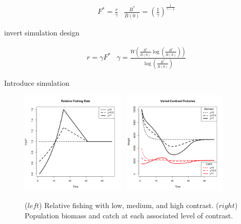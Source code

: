 \documentclass[ xcolor = pdftex, dvipsnames, table ]{beamer}
\begin{document}
%
\begin{frame}
%
\begin{align}\label{ptRP}
&F^* = \frac{r}{\gamma}
&\frac{B^*}{\bar B(0)} = \left(\frac{1}{\gamma}\right)^{\frac{1}{\gamma-1}}
\end{align}

\color{red} invert simulation design

%
\begin{align}
&r = \gamma F^*
&\gamma = \frac{W\left(\frac{B^*}{\bar B(0)}\log\left(\frac{B^*}{\bar B(0)}\right)\right)}{\log\left(\frac{B^*}{\bar B(0)}\right)}
\end{align}

\end{frame}

%
\begin{frame}
\color{red}
Introduce simulation
\end{frame}

%
\begin{frame}
%
\begin{figure}[h!]
\centering
\includegraphics[width=0.44\textwidth]{../../ptNew/relFish.png}
$~$
\includegraphics[width=0.44\textwidth]{../../ptNew/relSeries.png}
\caption{ \label{catchT45}
($left$) Relative fishing with low, medium, and high contrast.
($right$) Population biomass and catch at each associated level of contrast. %
}
\label{catch45}
\end{figure}
\end{frame}
\end{document}
